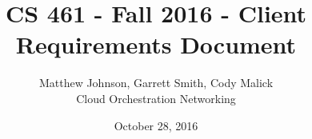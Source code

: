 \documentclass[10pt,letterpaper,onecolumn,draftclsnofoot]{IEEEtran}
\begin{document}
\begin{titlepage}
  \title{CS 461 - Fall 2016 - Client Requirements Document}
  \author{Matthew Johnson, Garrett Smith, Cody Malick\\Cloud Orchestration
  Networking}
  \date{October 28, 2016}
  \maketitle
  \vspace{4cm}
  \begin{abstract}
  	\noindent

  \end{abstract}

\end{titlepage}

\section*{}
\section*{}
\section*{}
\section*{}
\end{document}
